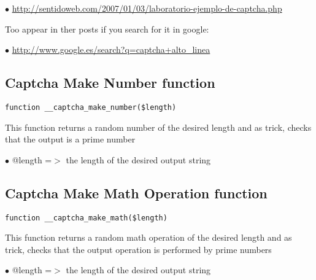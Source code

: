 \documentclass[a4paper]{book}
\def\htmladdnormallink#1#2{\href{#2}{#1}}
\begin{document}
\begin{compactitem}
\item[\color{myblue}$\bullet$] \htmladdnormallink{http://sentidoweb.com/2007/01/03/laboratorio-ejemplo-de-captcha.php}{http://sentidoweb.com/2007/01/03/laboratorio-ejemplo-de-captcha.php}
\end{compactitem}

Too appear in ther posts if you search for it in google:

\begin{compactitem}
\item[\color{myblue}$\bullet$] \htmladdnormallink{http://www.google.es/search?q=captcha+alto\_linea}{http://www.google.es/search?q=captcha+alto\_linea}
\end{compactitem}

\hypertarget{toc47}{}
\subsection{Captcha Make Number function}

\begin{lstlisting}
function __captcha_make_number($length)
\end{lstlisting}

This function returns a random number of the desired length and as trick,
checks that the output is a prime number

\begin{compactitem}
\item[\color{myblue}$\bullet$] @length =$>$ the length of the desired output string
\end{compactitem}

\hypertarget{toc48}{}
\subsection{Captcha Make Math Operation function}

\begin{lstlisting}
function __captcha_make_math($length)
\end{lstlisting}

This function returns a random math operation of the desired length and
as trick, checks that the output operation is performed by prime numbers

\begin{compactitem}
\item[\color{myblue}$\bullet$] @length =$>$ the length of the desired output string
\end{compactitem}
\end{document}

